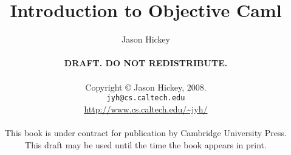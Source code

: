 \documentclass{book}
\title{Introduction to Objective Caml}
\author{Jason Hickey\\
\\
{\Large\textbf{DRAFT.  DO NOT REDISTRIBUTE.}}
\\
\\
Copyright \copyright{} Jason Hickey, 2008.\\
\lstinline/jyh@cs.caltech.edu/\\
\url{http://www.cs.caltech.edu/~jyh/}\\
\\
This book is under contract for publication by Cambridge University Press.\\
This draft may be used until the time the book appears in print.}
\begin{document}
\sloppy
\raggedbottom

\maketitle
\tableofcontents

%
\frontmatter


\mainmatter


































\backmatter
\appendix


%
\sloppy




\printindex
\end{document}
